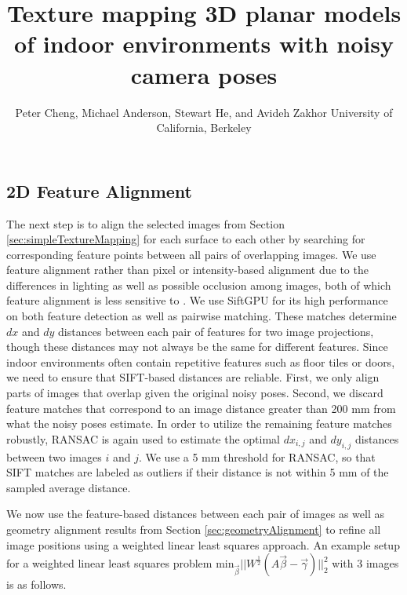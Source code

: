 \documentclass[]{spie}  %
\title{Texture mapping 3D planar models of indoor environments with noisy camera poses}
\author{Peter Cheng, Michael Anderson, Stewart He, and Avideh Zakhor
\skiplinehalf
University of California, Berkeley\\
}
\begin{document}
\subsection{2D Feature Alignment}
\label{sec:robustSIFTFeatureMatching}
The next step is to align the selected images from Section
\ref{sec:simpleTextureMapping} for each surface to each other by
searching for corresponding feature points between all pairs of
overlapping images. We use feature alignment rather than pixel or
intensity-based alignment due to the differences in lighting as well
as possible occlusion among images, both of which feature alignment is
less sensitive to \cite{lowe1999object, mikolajczyk2005performance,
  szeliski2006image}. We use SiftGPU \cite{siftgpu} for its high
performance on both feature detection as well as pairwise
matching. These matches determine $dx$ and $dy$ distances between each
pair of features for two image projections, though these distances may
not always be the same for different features. Since indoor
environments often contain repetitive features such as floor tiles or
doors, we need to ensure that SIFT-based distances are
reliable. First, we only align parts of images that overlap given the
original noisy poses. Second, we discard feature matches that
correspond to an image distance greater than 200 mm from what the
noisy poses estimate. In order to utilize the remaining feature
matches robustly, RANSAC \cite{fischler1981random} is again used to
estimate the optimal $dx_{i,j}$ and $dy_{i,j}$ distances between two
images $i$ and $j$. We use a 5 mm threshold for RANSAC, so that SIFT
matches are labeled as outliers if their distance is not within 5 mm
of the sampled average distance.


We now use the feature-based distances between each pair of images as
well as geometry alignment results from Section
\ref{sec:geometryAlignment} to refine all image positions using a
weighted linear least squares approach. An example setup for a
weighted linear least squares problem $\textrm{min}_{\vec{\beta}}
||W^\frac{1}{2}(A \vec{\beta} - \vec{\gamma})||_2^2 $ with 3 images is
as follows.
\end{document}
